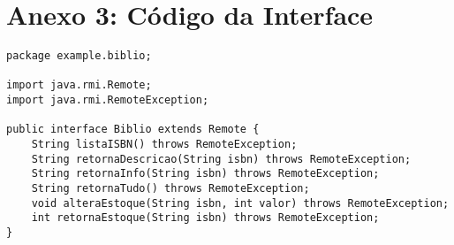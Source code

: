 \documentclass[11pt, brazil]{article} %
\begin{document}
\section*{Anexo 3: Código da Interface}
\begin{verbatim}
package example.biblio;

import java.rmi.Remote;
import java.rmi.RemoteException;

public interface Biblio extends Remote {
    String listaISBN() throws RemoteException;
    String retornaDescricao(String isbn) throws RemoteException;
    String retornaInfo(String isbn) throws RemoteException;
    String retornaTudo() throws RemoteException;
    void alteraEstoque(String isbn, int valor) throws RemoteException;
    int retornaEstoque(String isbn) throws RemoteException;
}
\end{verbatim}
\end{document}
